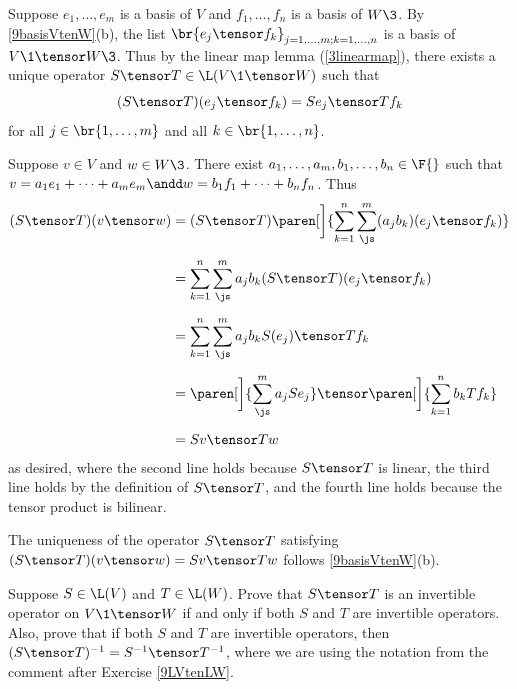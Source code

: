 \begin{Solution}
Suppose $e_1, \ldots, e_m$ is a basis of $V$ and $f_1, \ldots, f_n$ is a basis of $W\3$. By \ref{9basisVtenW}(b),
the list
$\br{e_j \tensor f_k}_{j = 1, \ldots, m; k = 1, \ldots, n}$ is a basis of $V\1 \tensor W\3$. Thus by the linear map lemma (\ref{3linearmap}), there exists a unique operator $S \tensor T \in \L(V\1 \tensor W)$ such that
\[
(S \tensor T)(e_j \tensor f_k) = Se_j \tensor T f_k
\]
for all $j \in \br{1, \ldots, m}$ and all $k \in \br{1, \ldots, n}$.

Suppose $v \in V$ and $w \in W\3$. There exist $a_1, \ldots, a_m, b_1, \ldots, b_n \in \F{}$ such that
$
v = a_1 e_1 + \cdots + a_m e_m \andd w = b_1 f_1 + \cdots + b_n f_n$.
Thus
\begin{align*}
(S \tensor T)(v \tensor w) &= (S \tensor T) \paren[\bigg]{ \sum_{k=1}^n \sum_{\js}^m  (a_j b_k) (e_j \tensor f_k) } \\[6bp]
&= \sum_{k=1}^n \sum_{\js}^m a_j b_k (S \tensor T)(e_j \tensor f_k) \\[6bp]
&= \sum_{k=1}^n \sum_{\js}^m a_j b_k S(e_j) \tensor Tf_k \\[6bp]
&= \paren[\bigg]{ \sum_{\js}^m a_j Se_j } \tensor \paren[\bigg]{ \sum_{k=1}^n b_k Tf_k } \\[6bp]
&= Sv \tensor Tw
\end{align*}
as desired, where the second line holds because $S \tensor T$ is linear, the third line holds by the definition of $S \tensor T$, and the fourth line holds because the tensor product is bilinear.

The uniqueness of the operator $S \tensor T$ satisfying $(S \tensor T)(v \tensor w) = Sv \tensor Tw$ follows \ref{9basisVtenW}(b).
\end{Solution}

\exercise
Suppose $S \in \L(V)$ and $T \in \L(W)$. Prove that $S \tensor T$ is an invertible operator on $V\1 \tensor W$ if and only if both $S$ and $T$ are invertible operators. Also, prove that  if both $S$ and $T$ are invertible operators, then
$(S \tensor T)^{-1} = S^{-1} \tensor T^{-1}$, where we are using the notation from the comment after Exercise \ref{9LVtenLW}.

